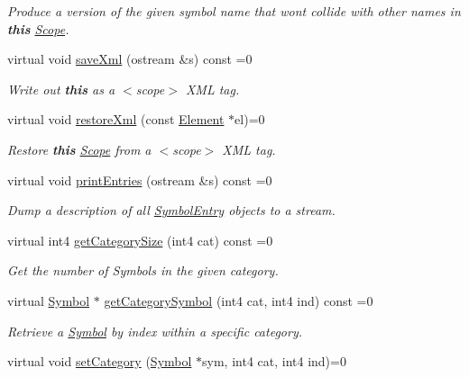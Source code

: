 \begin{DoxyCompactItemize}
\begin{DoxyCompactList}\small\item\em Produce a version of the given symbol name that won\textquotesingle{}t collide with other names in {\bfseries{this}} \mbox{\hyperlink{class_scope}{Scope}}. \end{DoxyCompactList}\item 
virtual void \mbox{\hyperlink{class_scope_a2583da1be37d68197dfbb0445fa1f3e0}{save\+Xml}} (ostream \&s) const =0
\begin{DoxyCompactList}\small\item\em Write out {\bfseries{this}} as a $<$scope$>$ X\+ML tag. \end{DoxyCompactList}\item 
virtual void \mbox{\hyperlink{class_scope_ad509027899b5f6af11f499f722d61f66}{restore\+Xml}} (const \mbox{\hyperlink{class_element}{Element}} $\ast$el)=0
\begin{DoxyCompactList}\small\item\em Restore {\bfseries{this}} \mbox{\hyperlink{class_scope}{Scope}} from a $<$scope$>$ X\+ML tag. \end{DoxyCompactList}\item 
virtual void \mbox{\hyperlink{class_scope_a7d67a1b9e60078023b508dd3cbe4447d}{print\+Entries}} (ostream \&s) const =0
\begin{DoxyCompactList}\small\item\em Dump a description of all \mbox{\hyperlink{class_symbol_entry}{Symbol\+Entry}} objects to a stream. \end{DoxyCompactList}\item 
virtual int4 \mbox{\hyperlink{class_scope_a909e15a7a96c9b402855b56b6bfdbd9f}{get\+Category\+Size}} (int4 cat) const =0
\begin{DoxyCompactList}\small\item\em Get the number of Symbols in the given category. \end{DoxyCompactList}\item 
virtual \mbox{\hyperlink{class_symbol}{Symbol}} $\ast$ \mbox{\hyperlink{class_scope_a491a168d7ea71f00da419dd864901ccb}{get\+Category\+Symbol}} (int4 cat, int4 ind) const =0
\begin{DoxyCompactList}\small\item\em Retrieve a \mbox{\hyperlink{class_symbol}{Symbol}} by index within a specific {\itshape category}. \end{DoxyCompactList}\item 
virtual void \mbox{\hyperlink{class_scope_ac807e11df36854d2f7983bdd6779e83a}{set\+Category}} (\mbox{\hyperlink{class_symbol}{Symbol}} $\ast$sym, int4 cat, int4 ind)=0

\end{DoxyCompactItemize}
